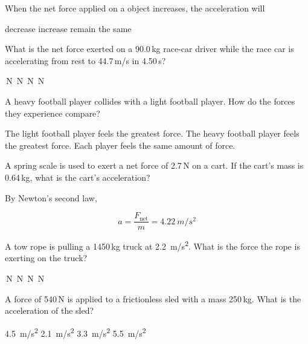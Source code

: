 \documentclass[]{exam}
\begin{document}
\begin{questions}

\question
When the net force applied on a object increases, the acceleration will

\begin{randomizechoices}[keeplast]
    \choice decrease
    \correctchoice increase
    \choice remain the same
\end{randomizechoices}

\question
What is the net force exerted on a 90.0\,kg race-car driver while the race car is accelerating from rest to 44.7\,m/s in 4.50\,s?

\begin{randomizechoices}
    \,N
    \,N
    \,N
    \,N
\end{randomizechoices}

\question
A heavy football player collides with a light football player. How do the forces they experience compare?

\begin{randomizechoices}
    \choice The light football player feels the greatest force.
    \choice The heavy football player feels the greatest force.
    \correctchoice Each player feels the same amount of force.
\end{randomizechoices}

\question
A spring scale is used to exert a net force of 2.7\,N on a cart. If the cart's mass is 0.64\,kg, what is the cart's acceleration?

\begin{solution}
By Newton's second law,

\begin{equation*}
    a = \frac{F_\mathrm{net}}{m} = \boxed{\SI{4.22}{m/s^2}}
\end{equation*}
\end{solution}

\question
A tow rope is pulling a 1450\,kg truck at \SI{2.2}{m/s^2}. What is the force the rope is exerting on the truck?

\begin{randomizechoices}
    \,N
    \,N
    \,N
    \,N
\end{randomizechoices}

\question
A force of 540\,N is applied to a frictionless sled with a mass 250\,kg. What is the acceleration of the sled?

\begin{randomizechoices}
    \choice \SI{4.5}{m/s^2}
    \correctchoice \SI{2.1}{m/s^2}
    \choice \SI{3.3}{m/s^2}
    \choice \SI{5.5}{m/s^2}
\end{randomizechoices}



\end{questions}
\end{document}
